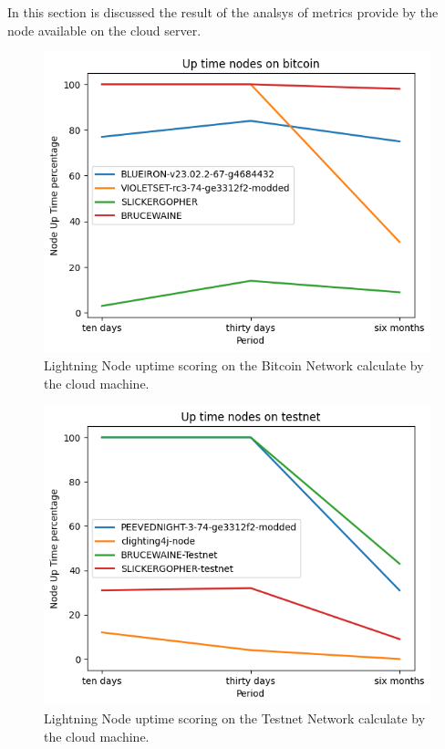 In this section is discussed the result of the analsys of metrics provide by 
the node available on the cloud server.

\begin{figure}
    \begin{center}
      \includegraphics[scale=0.7]{imgs/bitcoin_uptime.png}
    \end{center}
    \caption{Lightning Node uptime scoring on the Bitcoin Network calculate by the cloud machine.}
    \label{fig:lnmetrics_uptime_bitcoin}
\end{figure}

\begin{figure}
    \begin{center}
      \includegraphics[scale=0.7]{imgs/testnet_uptime.png}
    \end{center}
    \caption{Lightning Node uptime scoring on the Testnet Network calculate by the cloud machine.}
    \label{fig:lnmetrics_uptime_testnet}
\end{figure}

